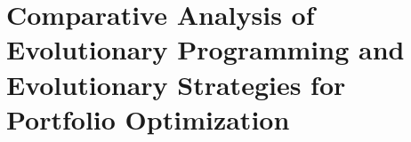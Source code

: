 \section{Comparative Analysis of Evolutionary Programming and Evolutionary Strategies for Portfolio Optimization}


